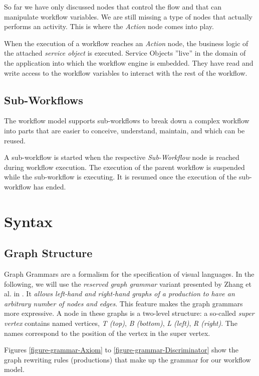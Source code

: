 So far we have only discussed nodes that control the flow and that can
manipulate workflow variables. We are still missing a type of nodes that
actually performs an activity. This is where the \emph{Action} node comes
into play.

When the execution of a workflow reaches an \emph{Action} node, the
business logic of the attached \emph{service object} is executed. Service
Objects ''live'' in the domain of the application into which the workflow
engine is embedded. They have read and write access to the workflow variables
to interact with the rest of the workflow.

\subsection{Sub-Workflows}

The workflow model supports sub-workflows to break down a complex workflow
into parts that are easier to conceive, understand, maintain, and which can
be reused.

A sub-workflow is started when the respective \emph{Sub-Workflow} node is
reached during workflow execution. The execution of the parent workflow is
suspended while the sub-workflow is executing. It is resumed once the
execution of the sub-workflow has ended.

\section{Syntax}
\label{section-Syntax}

\subsection{Graph Structure}

Graph Grammars are a formalism for the specification of visual languages. In
the following, we will use the \emph{reserved graph grammar} variant presented
by Zhang et al. in \cite{DQZ01}. It \emph{allows left-hand and right-hand
graphs of a production to have an arbitrary number of nodes and edges}. This
feature makes the graph grammars more expressive. A node in these graphs is a
two-level structure: a so-called \emph{super vertex} contains named vertices,
\emph{T (top)}, \emph{B (bottom)}, \emph{L (left)}, \emph{R (right)}. The
names correspond to the position of the vertex in the super vertex.

Figures \ref{figure-grammar-Axiom} to \ref{figure-grammar-Discriminator} show
the graph rewriting rules (productions) that make up the grammar for our
workflow model.

